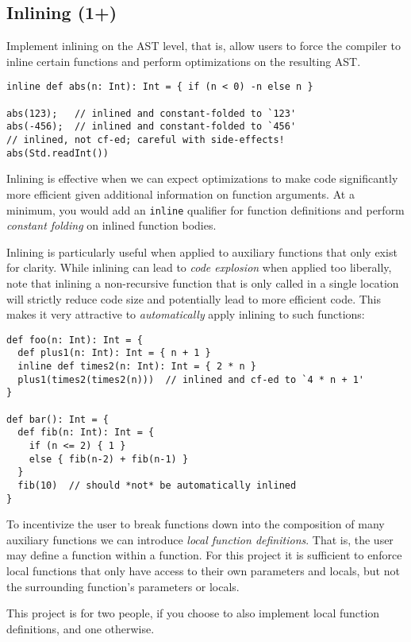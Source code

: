 \subsection{Inlining (1+)}

Implement inlining on the AST level, that is, allow users to force the compiler to inline certain
functions and perform optimizations on the resulting AST.

\begin{lstlisting}
inline def abs(n: Int): Int = { if (n < 0) -n else n }

abs(123);   // inlined and constant-folded to `123'
abs(-456);  // inlined and constant-folded to `456'
// inlined, not cf-ed; careful with side-effects!
abs(Std.readInt())
\end{lstlisting}

Inlining is effective when we can expect optimizations to make code significantly more
efficient given additional information on function arguments. At a minimum, you would add an
\lstinline{inline} qualifier for function definitions and perform \emph{constant folding} on 
inlined function bodies.

Inlining is particularly useful when applied to auxiliary functions that only exist for
clarity. While inlining can lead to \emph{code explosion} when applied too liberally, note that
inlining a non-recursive function that is only called in a single location will strictly reduce
code size and potentially lead to more efficient code.
This makes it very attractive to \emph{automatically} apply inlining to such functions:

\begin{lstlisting}
def foo(n: Int): Int = {
  def plus1(n: Int): Int = { n + 1 }
  inline def times2(n: Int): Int = { 2 * n }
  plus1(times2(times2(n)))  // inlined and cf-ed to `4 * n + 1'
}

def bar(): Int = {
  def fib(n: Int): Int = {
    if (n <= 2) { 1 }
    else { fib(n-2) + fib(n-1) }
  }
  fib(10)  // should *not* be automatically inlined
}
\end{lstlisting}

To incentivize the user to break functions down into the composition of many auxiliary functions
we can introduce \emph{local function definitions}. That is, the user may define a function within
a function. For this project it is sufficient to enforce local functions that only have access
to their own parameters and locals, but not the surrounding function's parameters or locals.

This project is for two people, if you choose to also implement local function definitions,
and one otherwise.